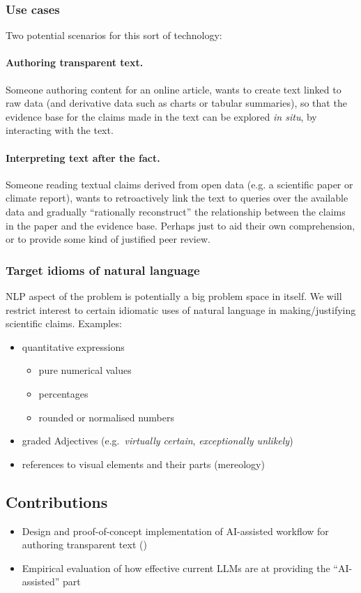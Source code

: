 \subsubsection{Use cases}
Two potential scenarios for this sort of technology:

\paragraph{Authoring transparent text.} Someone authoring content for an online article, wants to create text
linked to raw data (and derivative data such as charts or tabular summaries), so that the evidence base for
the claims made in the text can be explored \emph{in situ}, by interacting with the text.

\paragraph{Interpreting text after the fact.} Someone reading textual claims derived from open data (e.g. a
scientific paper or climate report), wants to retroactively link the text to queries over the available data
and gradually ``rationally reconstruct'' the relationship between the claims in the paper and the evidence
base. Perhaps just to aid their own comprehension, or to provide some kind of justified peer review.

\subsubsection{Target idioms of natural language}

NLP aspect of the problem is potentially a big problem space in itself. We will restrict interest to certain
idiomatic uses of natural language in making/justifying scientific claims. Examples:

\begin{itemize}
\item quantitative expressions
\begin{itemize}
   \item pure numerical values
   \item percentages
   \item rounded or normalised numbers
\end{itemize}
\item graded Adjectives (e.g.~\emph{virtually certain}, \emph{exceptionally unlikely})
\item references to visual elements and their parts (mereology)
\end{itemize}

\subsection{Contributions}

\begin{itemize}
\item Design and proof-of-concept implementation of AI-assisted workflow for authoring transparent text
()
\item Empirical evaluation of how effective current LLMs are at providing the ``AI-assisted'' part
\end{itemize}
